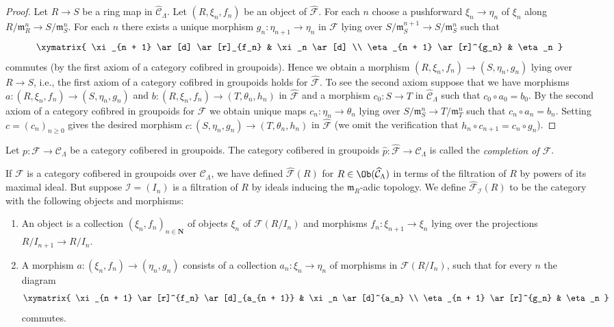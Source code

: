 \begin{proof}
Let $R \to S$ be a ring map in $\widehat{\mathcal{C}}_\Lambda$.
Let $(R, \xi_n, f_n)$ be an object of $\widehat{\mathcal{F}}$.
For each $n$ choose a pushforward $\xi_n \to \eta_n$ of $\xi_n$
along $R/\mathfrak m_R^n \to S/\mathfrak m_S^n$. For each $n$ there
exists a unique morphism $g_n : \eta_{n + 1} \to \eta_n$ in $\mathcal{F}$
lying over $S/\mathfrak m_S^{n + 1} \to S/\mathfrak m_S^n$ such that
$$
\xymatrix{
\xi_{n + 1} \ar[d] \ar[r]_{f_n} & \xi_n \ar[d] \\
\eta_{n + 1} \ar[r]^{g_n} & \eta_n
}
$$
commutes (by the first axiom of a category cofibred in groupoids).
Hence we obtain a morphism $(R, \xi_n, f_n) \to (S, \eta_n, g_n)$
lying over $R \to S$, i.e., the first axiom of a category cofibred in
groupoids holds for $\widehat{\mathcal{F}}$. To see the second axiom
suppose that we have morphisms
$a : (R, \xi_n, f_n) \to (S, \eta_n, g_n)$ and
$b : (R, \xi_n, f_n) \to (T, \theta_n, h_n)$ in $\widehat{\mathcal{F}}$
and a morphism $c_0 : S \to T$ in $\widehat{\mathcal{C}}_\Lambda$ such that
$c_0 \circ a_0 = b_0$. By the second axiom of a category cofibred in groupoids
for $\mathcal{F}$ we obtain unique maps $c_n : \eta_n \to \theta_n$
lying over $S/\mathfrak m_S^n \to T/\mathfrak m_T^n$ such that
$c_n \circ a_n = b_n$. Setting $c = (c_n)_{n \geq 0}$ gives the desired
morphism $c : (S, \eta_n, g_n) \to (T, \theta_n, h_n)$ in
$\widehat{\mathcal{F}}$ (we omit the verification that
$h_n \circ c_{n + 1} = c_n \circ g_n$).
\end{proof}

\begin{definition}
\label{definition-completion}
Let $p : \mathcal{F} \to \mathcal{C}_\Lambda$ be a category cofibered in
groupoids. The category cofibered in groupoids
$\widehat{p} : \widehat{\mathcal  F} \to \widehat{\mathcal{C}}_\Lambda$
is called the {\it completion of $\mathcal{F}$}.
\end{definition}

\noindent
If $\mathcal{F}$ is a category cofibered in groupoids over $\mathcal
C_\Lambda$, we have defined $\widehat{\mathcal{F}}(R)$ for $R \in
\Ob(\widehat{\mathcal{C}}_\Lambda)$ in terms of the filtration of
$R$ by powers of its maximal ideal.  But suppose $\mathcal{I} = (I_n)$ is a
filtration of $R$ by ideals inducing the $\mathfrak{m}_R$-adic topology.  We
define $\widehat{\mathcal{F}}_\mathcal{I}(R)$ to be the category with the
following objects and morphisms:
\begin{enumerate}
\item An object is a collection $(\xi_n, f_n)_{n \in \mathbf{N}}$ of
objects $\xi_n$ of $\mathcal{F}(R/I_n)$ and morphisms
$f_n : \xi_{n + 1} \to \xi_n$ lying over the projections
$R/I_{n + 1} \to R/I_n$.
\item A morphism $a : (\xi_n, f_n) \to (\eta_n, g_n)$ consists of a
collection $a_n : \xi_n \to \eta_n$ of morphisms in
$\mathcal{F}(R/I_n)$, such that for every $n$ the diagram
$$
\xymatrix{
\xi_{n + 1} \ar[r]^{f_n} \ar[d]_{a_{n + 1}} & \xi_n \ar[d]^{a_n} \\
\eta_{n + 1} \ar[r]^{g_n} & \eta_n
}
$$
commutes.
\end{enumerate}

